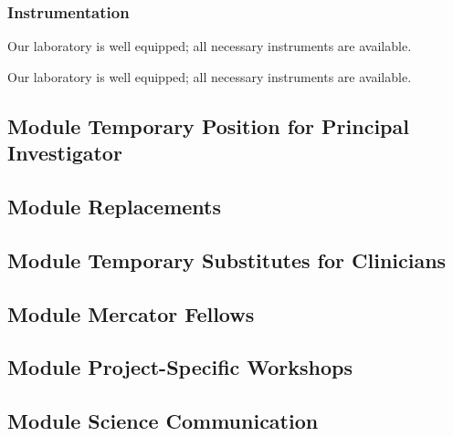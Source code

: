 \documentclass{scrartcl}
\begin{document}
\subsubsection{Instrumentation}

Our laboratory is well equipped; all necessary instruments are available.

Our laboratory is well equipped; all necessary instruments are available.



\vspace*{2cm}

\subsection{Module Temporary Position for Principal Investigator}

\subsection{Module Replacements}

\subsection{Module Temporary Substitutes for Clinicians}

\subsection{Module Mercator Fellows}

\subsection{Module Project-Specific Workshops}

\subsection{Module Science Communication}
\end{document}
